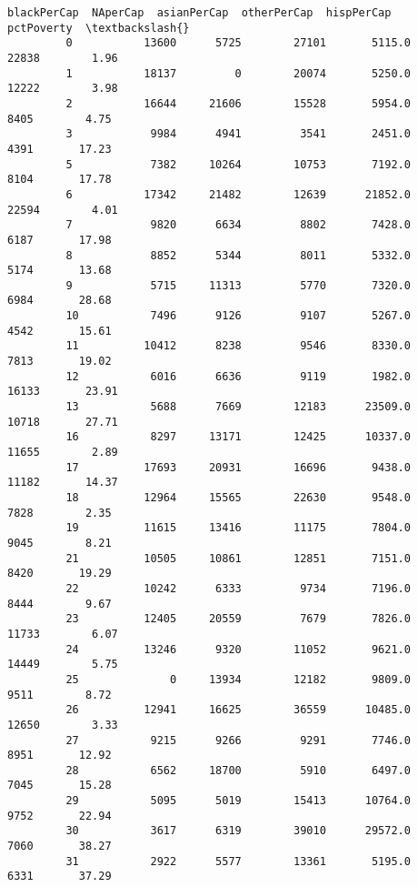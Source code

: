 \documentclass[11pt]{llncs}
\begin{document}
\begin{Verbatim}[commandchars=\\\{\}]
               blackPerCap  NAperCap  asianPerCap  otherPerCap  hispPerCap  pctPoverty  \textbackslash{}
         0           13600      5725        27101       5115.0       22838        1.96   
         1           18137         0        20074       5250.0       12222        3.98   
         2           16644     21606        15528       5954.0        8405        4.75   
         3            9984      4941         3541       2451.0        4391       17.23   
         5            7382     10264        10753       7192.0        8104       17.78   
         6           17342     21482        12639      21852.0       22594        4.01   
         7            9820      6634         8802       7428.0        6187       17.98   
         8            8852      5344         8011       5332.0        5174       13.68   
         9            5715     11313         5770       7320.0        6984       28.68   
         10           7496      9126         9107       5267.0        4542       15.61   
         11          10412      8238         9546       8330.0        7813       19.02   
         12           6016      6636         9119       1982.0       16133       23.91   
         13           5688      7669        12183      23509.0       10718       27.71   
         16           8297     13171        12425      10337.0       11655        2.89   
         17          17693     20931        16696       9438.0       11182       14.37   
         18          12964     15565        22630       9548.0        7828        2.35   
         19          11615     13416        11175       7804.0        9045        8.21   
         21          10505     10861        12851       7151.0        8420       19.29   
         22          10242      6333         9734       7196.0        8444        9.67   
         23          12405     20559         7679       7826.0       11733        6.07   
         24          13246      9320        11052       9621.0       14449        5.75   
         25              0     13934        12182       9809.0        9511        8.72   
         26          12941     16625        36559      10485.0       12650        3.33   
         27           9215      9266         9291       7746.0        8951       12.92   
         28           6562     18700         5910       6497.0        7045       15.28   
         29           5095      5019        15413      10764.0        9752       22.94   
         30           3617      6319        39010      29572.0        7060       38.27   
         31           2922      5577        13361       5195.0        6331       37.29   

\end{Verbatim}
\end{document}
